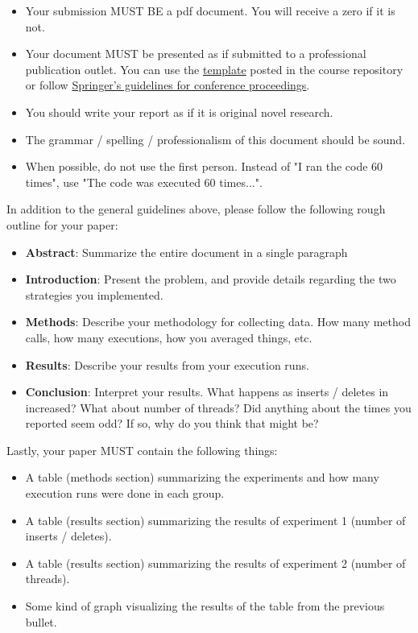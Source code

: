 \documentclass[paper=a4, fontsize=11pt, parskip=full]{scrartcl} %
\numberwithin{equation}{section} %
\numberwithin{figure}{section} %
\numberwithin{table}{section} %
\begin{document}
\begin{itemize}
	\item Your submission MUST BE a pdf document. You will receive a zero if it is not.
	\item Your document MUST be presented as if submitted to a professional publication outlet. You can use the \href{https://markfloryan.github.io/dsa1/homeworks/WordPaperTemplate.zip}{template} posted in the course repository or follow \href{https://www.springer.com/us/computer-science/lncs/conference-proceedings-guidelines}{Springer's guidelines for conference proceedings}.
	\item You should write your report as if it is original novel research.
	\item The grammar / spelling / professionalism of this document should be sound.
	\item When possible, do not use the first person. Instead of "I ran the code 60 times", use "The code was executed 60 times...".
\end{itemize}

In addition to the general guidelines above, please follow the following rough outline for your paper:

\begin{itemize}
	\item \textbf{Abstract}: Summarize the entire document in a single paragraph
	\item \textbf{Introduction}: Present the problem, and provide details regarding the two strategies you implemented.
	\item \textbf{Methods}: Describe your methodology for collecting data. How many method calls, how many executions, how you averaged things, etc.
	\item \textbf{Results}: Describe your results from your execution runs.
	\item \textbf{Conclusion}: Interpret your results. What happens as inserts / deletes in increased? What about number of threads? Did anything about the times you reported seem odd? If so, why do you think that might be?
\end{itemize}

Lastly, your paper MUST contain the following things:

\begin{itemize}
	\item A table (methods section) summarizing the experiments and how many execution runs were done in each group.
	\item A table (results section) summarizing the results of experiment 1 (number of inserts / deletes).
	\item A table (results section) summarizing the results of experiment 2 (number of threads).
	\item Some kind of graph visualizing the results of the table from the previous bullet.
\end{itemize}


\end{document}
